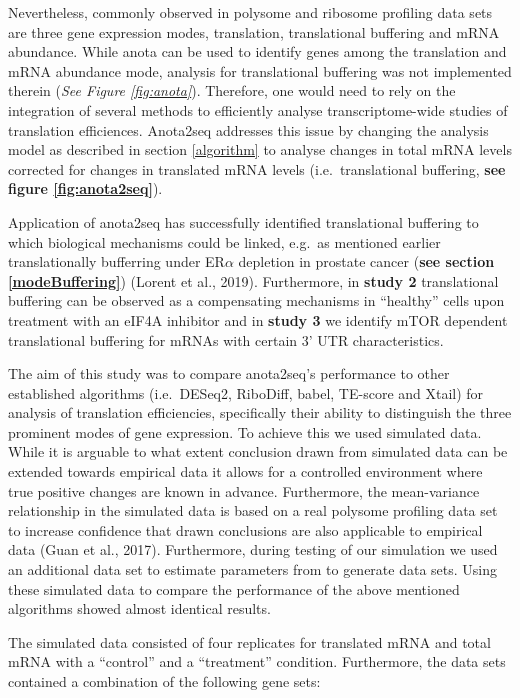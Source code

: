 \documentclass[12pt,openany]{book}
\begin{document}
Nevertheless, commonly observed in polysome and ribosome profiling data
sets are three gene expression modes, translation, translational
buffering and mRNA abundance. While anota can be used to identify genes
among the translation and mRNA abundance mode, analysis for
translational buffering was not implemented therein (\emph{See Figure
\ref{fig:anota}}). Therefore, one would need to rely on the integration
of several methods to efficiently analyse transcriptome-wide studies of
translation efficiences. Anota2seq addresses this issue by changing the
analysis model as described in section \ref{algorithm} to analyse
changes in total mRNA levels corrected for changes in translated mRNA
levels (i.e.~translational buffering, \textbf{see figure
\ref{fig:anota2seq}}).

Application of anota2seq has successfully identified translational
buffering to which biological mechanisms could be linked, e.g.~as
mentioned earlier translationally bufferring under ER\(\alpha\)
depletion in prostate cancer (\textbf{see section \ref{modeBuffering}})
(Lorent et al., 2019). Furthermore, in \textbf{study 2} translational
buffering can be observed as a compensating mechanisms in ``healthy''
cells upon treatment with an eIF4A inhibitor and in \textbf{study 3} we
identify mTOR dependent translational buffering for mRNAs with certain
3' UTR characteristics.

The aim of this study was to compare anota2seq's performance to other
established algorithms (i.e.~DESeq2, RiboDiff, babel, TE-score and
Xtail) for analysis of translation efficiencies, specifically their
ability to distinguish the three prominent modes of gene expression. To
achieve this we used simulated data. While it is arguable to what extent
conclusion drawn from simulated data can be extended towards empirical
data it allows for a controlled environment where true positive changes
are known in advance. Furthermore, the mean-variance relationship in the
simulated data is based on a real polysome profiling data set to
increase confidence that drawn conclusions are also applicable to
empirical data (Guan et al., 2017). Furthermore, during testing of our
simulation we used an additional data set to estimate parameters from to
generate data sets. Using these simulated data to compare the
performance of the above mentioned algorithms showed almost identical
results.

The simulated data consisted of four replicates for translated mRNA and
total mRNA with a ``control'' and a ``treatment'' condition.
Furthermore, the data sets contained a combination of the following gene
sets:
\end{document}
